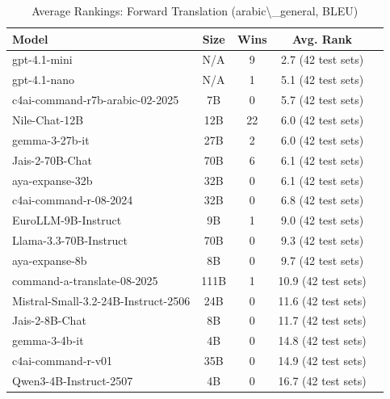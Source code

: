 \begin{table}[htbp]
\centering
\caption{Average Rankings: Forward Translation (arabic\textbackslash{}_general, BLEU)}
\label{tab:avg_rankings_bleu_arabic_general}
\begin{tabular}{l@{\hspace{3pt}}c@{\hspace{3pt}}c@{\hspace{3pt}}c@{\hspace{3pt}}c}
\toprule
Model & Size & Wins & Avg. Rank \\
\midrule
gpt-4.1-mini & N/A & 9 & 2.7 (42 test sets) \\
gpt-4.1-nano & N/A & 1 & 5.1 (42 test sets) \\
c4ai-command-r7b-arabic-02-2025 & 7B & 0 & 5.7 (42 test sets) \\
Nile-Chat-12B & 12B & 22 & 6.0 (42 test sets) \\
gemma-3-27b-it & 27B & 2 & 6.0 (42 test sets) \\
Jais-2-70B-Chat & 70B & 6 & 6.1 (42 test sets) \\
aya-expanse-32b & 32B & 0 & 6.1 (42 test sets) \\
c4ai-command-r-08-2024 & 32B & 0 & 6.8 (42 test sets) \\
EuroLLM-9B-Instruct & 9B & 1 & 9.0 (42 test sets) \\
Llama-3.3-70B-Instruct & 70B & 0 & 9.3 (42 test sets) \\
aya-expanse-8b & 8B & 0 & 9.7 (42 test sets) \\
command-a-translate-08-2025 & 111B & 1 & 10.9 (42 test sets) \\
Mistral-Small-3.2-24B-Instruct-2506 & 24B & 0 & 11.6 (42 test sets) \\
Jais-2-8B-Chat & 8B & 0 & 11.7 (42 test sets) \\
gemma-3-4b-it & 4B & 0 & 14.8 (42 test sets) \\
c4ai-command-r-v01 & 35B & 0 & 14.9 (42 test sets) \\
Qwen3-4B-Instruct-2507 & 4B & 0 & 16.7 (42 test sets) \\
\bottomrule
\end{tabular}
\end{table}